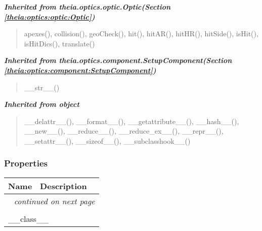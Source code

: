 \large{\textbf{\textit{Inherited from theia.optics.optic.Optic\textit{(Section \ref{theia:optics:optic:Optic})}}}}

\begin{quote}
apexes(), collision(), geoCheck(), hit(), hitAR(), hitHR(), hitSide(), isHit(), isHitDics(), translate()
\end{quote}

\large{\textbf{\textit{Inherited from theia.optics.component.SetupComponent\textit{(Section \ref{theia:optics:component:SetupComponent})}}}}

\begin{quote}
\_\_str\_\_()
\end{quote}

\large{\textbf{\textit{Inherited from object}}}

\begin{quote}
\_\_delattr\_\_(), \_\_format\_\_(), \_\_getattribute\_\_(), \_\_hash\_\_(), \_\_new\_\_(), \_\_reduce\_\_(), \_\_reduce\_ex\_\_(), \_\_repr\_\_(), \_\_setattr\_\_(), \_\_sizeof\_\_(), \_\_subclasshook\_\_()
\end{quote}


  \subsubsection{Properties}

    \vspace{-1cm}
\hspace{\varindent}\begin{longtable}{|p{\varnamewidth}|p{\vardescrwidth}|l}
\cline{1-2}
\cline{1-2} \centering \textbf{Name} & \centering \textbf{Description}& \\
\cline{1-2}
\endhead\cline{1-2}\multicolumn{3}{r}{\small\textit{continued on next page}}\\\endfoot\cline{1-2}
\endlastfoot\multicolumn{2}{|l|}{\textit{Inherited from object}}\\
\multicolumn{2}{|p{\varwidth}|}{\raggedright \_\_class\_\_}\\
\cline{1-2}
\end{longtable}



